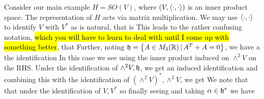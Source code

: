 \documentclass{article}
\begin{document}
\begin{example}
Consider our main example $H=SO(V)$, where $(V,\left\langle \cdot, \cdot \right\rangle)$ is an inner product space. The representation of $H$ acts via matrix multiplication. We may use $\left\langle \cdot, \cdot \right\rangle$ to identify $V$ with $V^\ast$ as is natural, that is 
This leads to the rather confusing notation, \hl{which you will have to learn to deal with until I come up with something better}, that 
Further, noting $\mathfrak{h} = \left\{ A \in M_3(\mathbb{R}) \, | \, A^T + A = 0 \right\}$, we have a the identification 
In this case we see 
using the inner product induced on $\wedge^2V$ on the RHS. Under the identification of $\wedge^2 V, \mathfrak{h}$, we get an induced identification 
and combining this with the identification of $(\wedge^2 V)^\ast, \wedge^2 V$, we get 
We note that that under the identification of $V,V^\ast $
so finally seeing 
and taking $\alpha \in \mathfrak{h}^\ast$ we have 
\end{example}
\end{document}
